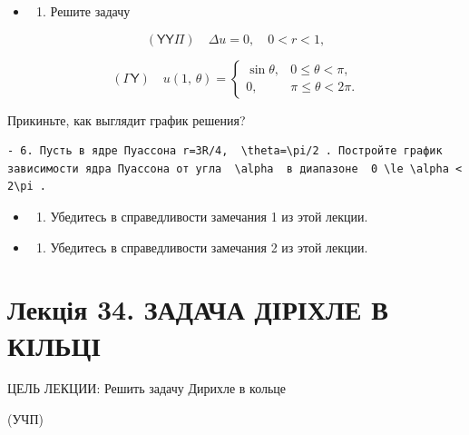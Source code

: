 \documentclass[
  ukrainian,
]{article}
\providecommand{\tightlist}{%
  \setlength{\itemsep}{0pt}\setlength{\parskip}{0pt}}
\begin{document}
\begin{itemize}
\tightlist
\item
  \begin{enumerate}
  \def\labelenumi{\arabic{enumi}.}
  \setcounter{enumi}{4}
  \tightlist
  \item
    Решите задачу
  \end{enumerate}
\end{itemize}

\[
(\mathsf{Y}\mathsf{Y}\mathsf{\Pi}) \quad \Delta u = 0, \quad 0 < r < 1,
\]

\[
(\mathsf{\Gamma}\mathsf{Y}) \quad u(1, \, \theta) = \begin{cases} \sin \theta, & 0 \le \theta < \pi, \\ 0, & \pi \le \theta < 2\pi. \end{cases}
\]

Прикиньте, как выглядит график решения?

\begin{verbatim}
- 6. Пусть в ядре Пуассона r=3R/4,  \theta=\pi/2 . Постройте график зависимости ядра Пуассона от угла  \alpha  в диапазоне  0 \le \alpha < 2\pi .
\end{verbatim}

\begin{itemize}
\tightlist
\item
  \begin{enumerate}
  \def\labelenumi{\arabic{enumi}.}
  \setcounter{enumi}{6}
  \tightlist
  \item
    Убедитесь в справедливости замечания 1 из этой лекции.
  \end{enumerate}
\item
  \begin{enumerate}
  \def\labelenumi{\arabic{enumi}.}
  \setcounter{enumi}{7}
  \tightlist
  \item
    Убедитесь в справедливости замечания 2 из этой лекции.
  \end{enumerate}
\end{itemize}

\section{Лекція 34. ЗАДАЧА ДІРІХЛЕ В
КІЛЬЦІ}\label{ux43bux435ux43aux446ux456ux44f-34.-ux437ux430ux434ux430ux447ux430-ux434ux456ux440ux456ux445ux43bux435-ux432-ux43aux456ux43bux44cux446ux456}

ЦЕЛЬ ЛЕКЦИИ: Решить задачу Дирихле в кольце

(УЧП)
\end{document}
